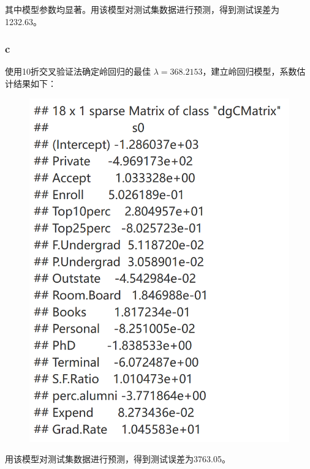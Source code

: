 \documentclass[12pt,a4paper]{article}
\begin{document}
    其中模型参数均显著。用该模型对测试集数据进行预测，得到测试误差为1232.63。
    \subsubsection*{c}
    使用10折交叉验证法确定岭回归的最佳 $\lambda=368.2153$，建立岭回归模型，系数估计结果如下：
    \begin{figure}[H]
        \centering
        \includegraphics[scale=0.25]{Ridge.png}
    \end{figure}
    用该模型对测试集数据进行预测，得到测试误差为3763.05。
\end{document}
